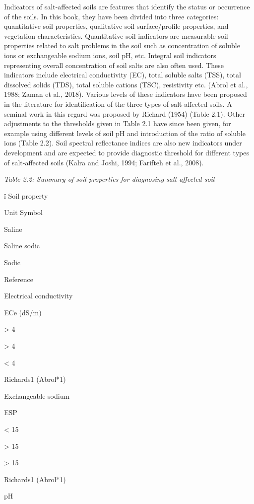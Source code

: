 \documentclass[
  10pt,
  b5paper,
]{book}
\begin{document}
Indicators of salt-affected soils are features that identify the status or occurrence of the soils. In this book, they have been divided into three categories: quantitative soil properties, qualitative soil surface/profile properties, and vegetation characteristics.
Quantitative soil indicators are measurable soil properties related to salt problems in the soil such as concentration of soluble ions or exchangeable sodium ions, soil pH, etc. Integral soil indicators representing overall concentration of soil salts are also often used. These indicators include electrical conductivity (EC), total soluble salts (TSS), total dissolved solids (TDS), total soluble cations (TSC), resistivity etc. (Abrol et al., 1988; Zaman et al., 2018). Various levels of these indicators have been proposed in the literature for identification of the three types of salt-affected soils. A seminal work in this regard was proposed by Richard (1954) (Table 2.1). Other adjustments to the thresholds given in Table 2.1 have since been given, for example using different levels of soil pH and introduction of the ratio of soluble ions (Table 2.2). Soil spectral reflectance indices are also new indicators under development and are expected to provide diagnostic threshold for different types of salt-affected soils (Kalra and Joshi, 1994; Farifteh et al., 2008).

\emph{Table 2.2: Summary of soil properties for diagnosing salt-affected soil}

ï Soil property

Unit Symbol

Saline

Saline sodic

Sodic

Reference

Electrical conductivity

ECe (dS/m)

\textgreater{} 4

\textgreater{} 4

\textless{} 4

Richards1 (Abrol*1)

Exchangeable sodium

ESP

\textless{} 15

\textgreater{} 15

\textgreater{} 15

Richards1 (Abrol*1)

pH
\end{document}
